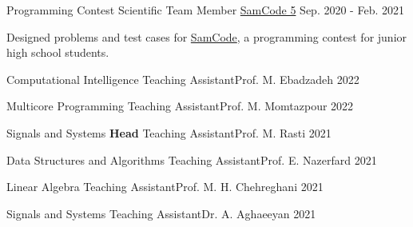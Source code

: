 \begin{cventries}
  \cventry
    {Programming Contest Scientific Team Member} %
    {\href{https://samcode.allamehelli3.ir/staff.html}{SamCode 5}} %
    {} %
    {Sep. 2020 - Feb. 2021} %
    {
      \begin{cvitems} %
        \item {Designed problems and test cases for {\href{https://samcode.allamehelli3.ir/}{SamCode}}, a programming contest for junior high school students.}
      \end{cvitems}
    }

\end{cventries}


\newcommand{\taprefix}{Teaching Assistant{\enskip\cdotp\enskip}}

\begin{cvhonors}

  \cvhonor
    {Computational Intelligence} %
    {\taprefix Prof. M. Ebadzadeh} %
    {} %
    {2022} %

  \cvhonor
    {Multicore Programming} %
    {\taprefix Prof. M. Momtazpour} %
    {} %
    {2022} %

  \cvhonor
    {Signals and Systems} %
    {\textbf{Head} \taprefix Prof. M. Rasti} %
    {} %
    {2021} %

  \cvhonor
    {Data Structures and Algorithms} %
    {\taprefix Prof. E. Nazerfard} %
    {} %
    {2021} %

  \cvhonor
    {Linear Algebra} %
    {\taprefix Prof. M. H. Chehreghani} %
    {} %
    {2021} %

  \cvhonor
    {Signals and Systems} %
    {\taprefix Dr. A. Aghaeeyan} %
    {} %
    {2021} %

\end{cvhonors}
